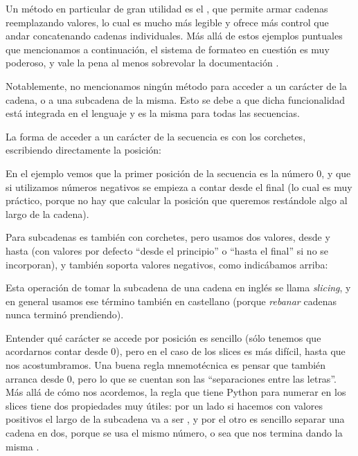 
Un método en particular de gran utilidad es el , que permite armar cadenas reemplazando valores, lo cual es mucho más legible y ofrece más control que andar concatenando cadenas individuales. Más allá de estos ejemplos puntuales que mencionamos a continuación, el sistema de formateo en cuestión es muy poderoso, y vale la pena al menos sobrevolar la documentación \cite{stdlib_format}.


Notablemente, no mencionamos ningún método para acceder a un carácter de la cadena, o a una subcadena de la misma. Esto se debe a que dicha funcionalidad está integrada en el lenguaje y es la misma para todas las secuencias.

La forma de acceder a un carácter de la secuencia es con los corchetes, escribiendo directamente la posición:


En el ejemplo vemos que la primer posición de la secuencia es la número 0, y que si utilizamos números negativos se empieza a contar desde el final (lo cual es muy práctico, porque no hay que calcular la posición que queremos restándole algo al largo de la cadena).

Para subcadenas es también con corchetes, pero usamos dos valores, desde y hasta (con valores por defecto ``desde el principio'' o ``hasta el final'' si no se incorporan), y también soporta valores negativos, como indicábamos arriba:


Esta operación de tomar la subcadena de una cadena en inglés se llama \textit{slicing}, y en general usamos ese término también en castellano (porque \textit{rebanar} cadenas nunca terminó prendiendo). 

Entender qué carácter se accede por posición es sencillo (sólo tenemos que acordarnos contar desde 0), pero en el caso de los slices es más difícil, hasta que nos acostumbramos. Una buena regla mnemotécnica es pensar que también arranca desde 0, pero lo que se cuentan son las ``separaciones entre las letras''. Más allá de cómo nos acordemos, la regla que tiene Python para numerar en los slices tiene dos propiedades muy útiles: por un lado si hacemos  con valores positivos el largo de la subcadena va a ser , y por el otro es sencillo separar una cadena en dos, porque se usa el mismo número, o sea que  nos termina dando la misma .

